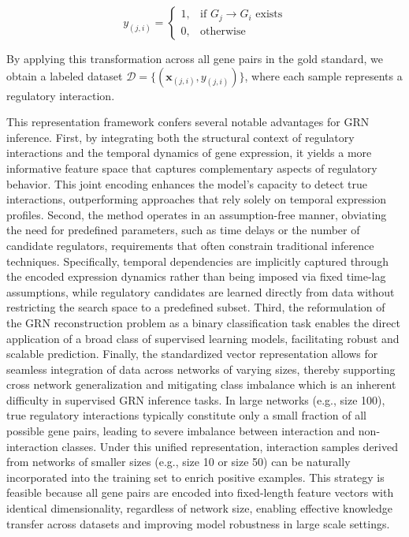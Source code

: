 $$
y_{(j,i)} = 
\begin{cases}
1, & \text{if } G_j \rightarrow G_i \text{ exists} \\
0, & \text{otherwise}
\end{cases}
$$

By applying this transformation across all gene pairs in the gold standard, we obtain a labeled dataset $\mathcal{D} = \{ (\mathbf{x}_{(j,i)}, y_{(j,i)}) \}$, where each sample represents a regulatory interaction.

This representation framework confers several notable advantages for GRN inference. First, by integrating both the structural context of regulatory interactions and the temporal dynamics of gene expression, it yields a more informative feature space that captures complementary aspects of regulatory behavior. This joint encoding enhances the model’s capacity to detect true interactions, outperforming approaches that rely solely on temporal expression profiles. Second, the method operates in an assumption-free manner, obviating the need for predefined parameters, such as time delays or the number of candidate regulators, requirements that often constrain traditional inference techniques. Specifically, temporal dependencies are implicitly captured through the encoded expression dynamics rather than being imposed via fixed time-lag assumptions, while regulatory candidates are learned directly from data without restricting the search space to a predefined subset. Third, the reformulation of the GRN reconstruction problem as a binary classification task enables the direct application of a broad class of supervised learning models, facilitating robust and scalable prediction. Finally, the standardized vector representation allows for seamless integration of data across networks of varying sizes, thereby supporting cross network generalization and mitigating class imbalance which is an inherent difficulty in supervised GRN inference tasks. In large networks (e.g., size 100), true regulatory interactions typically constitute only a small fraction of all possible gene pairs, leading to severe imbalance between interaction and non-interaction classes. Under this unified representation, interaction samples derived from networks of smaller sizes (e.g., size 10 or size 50) can be naturally incorporated into the training set to enrich positive examples. This strategy is feasible because all gene pairs are encoded into fixed-length feature vectors with identical dimensionality, regardless of network size, enabling effective knowledge transfer across datasets and improving model robustness in large scale settings.

